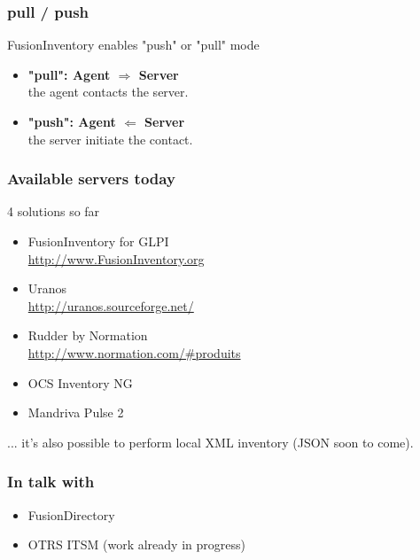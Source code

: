 \documentclass{beamer}
\begin{document}
\begin{frame}
    \frametitle{pull / push}

    \begin{block}{FusionInventory enables "push" or "pull" mode}
    \begin{itemize}
    \item \textbf{"pull": Agent $\Longrightarrow$ Server} \\
    the agent contacts the server.
    \item \textbf{"push": Agent $\Longleftarrow$ Server} \\
    the server initiate the contact.
    \end{itemize}
    \end{block}

\end{frame}


\begin{frame}
    \frametitle{Available servers today}

    \begin{block}{4 solutions so far}
        \begin{itemize}
            \item FusionInventory for GLPI \\
            \url{http://www.FusionInventory.org}
            \item Uranos \\
            \url{http://uranos.sourceforge.net/}
            \item Rudder by Normation \\
            \url{http://www.normation.com/\#produits}
            \item OCS Inventory NG
            \item Mandriva Pulse 2

        \end{itemize}
        ... it's also possible to perform local XML inventory (JSON soon to come).
    \end{block}

\end{frame}

\begin{frame}
    \frametitle{In talk with}

    \begin{itemize}
    \item FusionDirectory
    \item OTRS ITSM (work already in progress)
    \end{itemize}
\end{frame}
\end{document}
